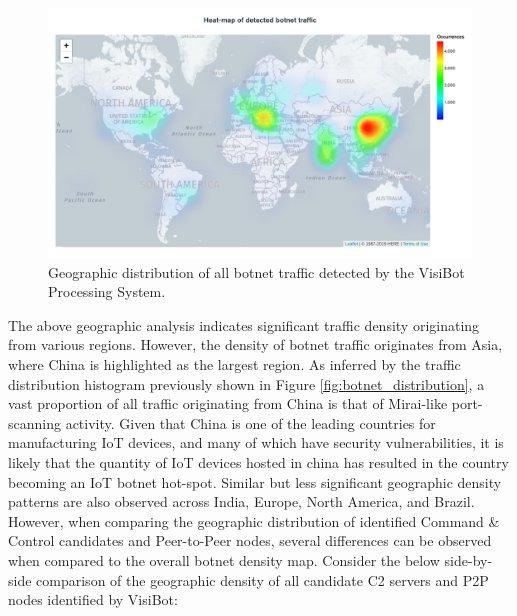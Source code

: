 \begin{figure}[!htb]
    \centering
    \includegraphics[width=0.8\linewidth]{results/all_heatmap.png}
    \caption{Geographic distribution of all botnet traffic detected by the VisiBot Processing System.}
    \label{fig:overall_heatmap} 
\end{figure}

The above geographic analysis indicates significant traffic density originating from various regions. However, the density of botnet traffic originates from Asia, where China is highlighted as the largest region. As inferred by the traffic distribution histogram previously shown in Figure \ref{fig:botnet_distribution}, a vast proportion of all traffic originating from China is that of Mirai-like port-scanning activity. Given that China is one of the leading countries for manufacturing IoT devices, and many of which have security vulnerabilities, it is likely that the quantity of IoT devices hosted in china has resulted in the country becoming an IoT botnet hot-spot. Similar but less significant geographic density patterns are also observed across India, Europe, North America, and Brazil. However, when comparing the geographic distribution of identified Command \& Control candidates and Peer-to-Peer nodes, several differences can be observed when compared to the overall botnet density map. Consider the below side-by-side comparison of the geographic density of all candidate C2 servers and P2P nodes identified by VisiBot:

